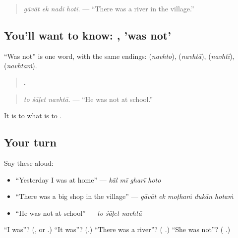 \begin{quote}
\emph{gāvāt ek nadī hotī.} — \textquotedblleft{}There was a river in the village.\textquotedblright{}
\end{quote}

\subsection*{You'll want to know: , 'was not'}
\textquotedblleft{}Was not\textquotedblright{} is one word, with the same endings: \textbf{} (\emph{navhto}), \textbf{} (\emph{navhtā}), \textbf{} (\emph{navhtī}), \textbf{} (\emph{navhtaṁ}).

\begin{quote}
\textbf{  .}
\end{quote}

\begin{quote}
\emph{to śāḷet navhtā.} — \textquotedblleft{}He was not at school.\textquotedblright{}
\end{quote}

It is to \textbf{} what \textbf{} is to \textbf{}.

\subsection*{Your turn}
Say these aloud:

\begin{itemize}
\raggedright
  \item \textquotedblleft{}Yesterday I was at home\textquotedblright{} — \emph{kāl mī gharī hoto}
  \item \textquotedblleft{}There was a big shop in the village\textquotedblright{} — \emph{gāvāt ek moṭhaṁ dukān hotaṁ}
  \item \textquotedblleft{}He was not at school\textquotedblright{} — \emph{to śāḷet navhtā}
\end{itemize}

\begin{tcolorbox}[breakable,colback=teal!4,colframe=teal!35!black,title={Before you move on}]
\textquotedblleft{}I was\textquotedblright{}? (\textbf{}, or \textbf{}.) \textquotedblleft{}It was\textquotedblright{}? (\textbf{}.) \textquotedblleft{}There was a river\textquotedblright{}? (\textbf{  }.) \textquotedblleft{}She was not\textquotedblright{}? (\textbf{ }.)
\end{tcolorbox}
